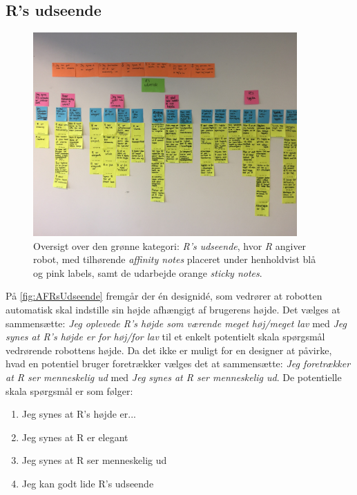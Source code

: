 \subsection{R's udseende}
\label{ParametreRsUdseende}
%
\begin{figure}[H]
\centering
\includegraphics[width = 0.9\textwidth]{Figure/AffinityDiagram/RsUdseende} 
\caption{Oversigt over den grønne kategori: \textit{R's udseende}, hvor \textit{R} angiver robot, med tilhørende \textit{affinity notes} placeret under henholdvist blå og pink labels, samt de udarbejde orange \textit{sticky notes}.}
\label{fig:AFRsUdseende}
\end{figure}
\noindent
%
På \autoref{fig:AFRsUdseende} fremgår der én designidé, som vedrører at robotten automatisk skal indstille sin højde afhængigt af brugerens højde. Det vælges at sammensætte: \textit{Jeg oplevede R's højde som værende meget høj/meget lav} med \textit{Jeg synes at R's højde er for høj/for lav} til et enkelt potentielt skala spørgsmål vedrørende robottens højde. Da det ikke er muligt for en designer at påvirke, hvad en potentiel bruger foretrækker vælges det at sammensætte: \textit{Jeg foretrækker at R ser menneskelig ud} med \textit{Jeg synes at R ser menneskelig ud}. De potentielle skala spørgsmål er som følger: \blankline
% 
\begin{enumerate}
  \item Jeg synes at R's højde er... 
  \item Jeg synes at R er elegant
  \item Jeg synes at R ser menneskelig ud
  \item Jeg kan godt lide R's udseende\blankline
\end{enumerate}
